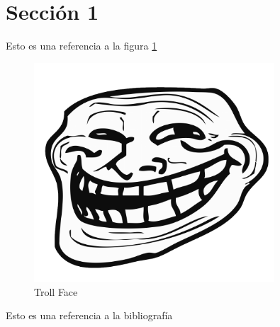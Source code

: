 \section{Sección 1}

Esto es una referencia a la figura \ref{fig:troll_face}

\begin{figure}[!h]
	\centering
	\includegraphics[width = 0.8\textwidth]{Imagenes/S1/troll.png}
	\caption{Troll Face}
	\label{fig:troll_face}
\end{figure}

Esto es una referencia a la bibliografía \cite{Reliability-NASA}